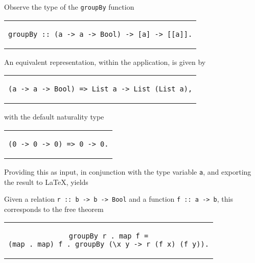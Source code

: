\documentclass[../Dissertation.tex]{subfiles}
\begin{document}
Observe the type of the \lstinline{groupBy} function
\begin{center}
\begin{tabular}{c}
\begin{lstlisting}
groupBy :: (a -> a -> Bool) -> [a] -> [[a]].
\end{lstlisting}
\end{tabular}
\end{center}
An equivalent representation, within the application, is given by
\begin{center}
\begin{tabular}{c}
\begin{lstlisting}
(a -> a -> Bool) => List a -> List (List a),
\end{lstlisting}
\end{tabular}
\end{center}
with the default naturality type
\begin{center}
\begin{tabular}{c}
\begin{lstlisting}
(0 -> 0 -> 0) => 0 -> 0.
\end{lstlisting}
\end{tabular}
\end{center}
\noindent
Providing this as input, in conjunction with the type variable \lstinline{a}, and exporting the result to LaTeX, yields
\begin{center}
\end{center}
\noindent
Given a relation \lstinline{r :: b -> b -> Bool} and a function \lstinline{f :: a -> b}, this corresponds to the free theorem
\begin{center}
\begin{tabular}{c}
\begin{lstlisting}[basicstyle=\ttfamily,style=haskellStyle]
groupBy r . map f =
(map . map) f . groupBy (\x y -> r (f x) (f y)).
\end{lstlisting}
\end{tabular}
\end{center}
\end{document}
